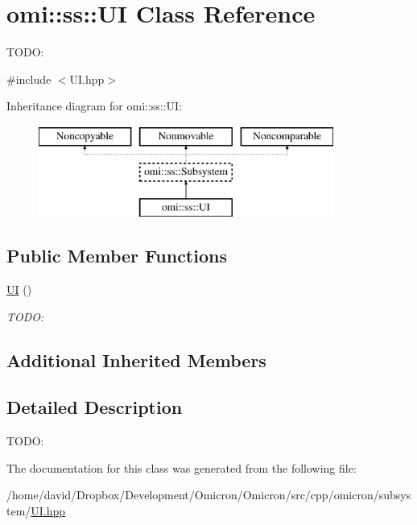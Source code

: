 \hypertarget{classomi_1_1ss_1_1_u_i}{}\section{omi\+:\+:ss\+:\+:UI Class Reference}
\label{classomi_1_1ss_1_1_u_i}


T\+O\+DO\+:  




{\ttfamily \#include $<$U\+I.\+hpp$>$}

Inheritance diagram for omi\+:\+:ss\+:\+:UI\+:\begin{figure}[H]
\begin{center}
\leavevmode
\includegraphics[height=3.000000cm]{classomi_1_1ss_1_1_u_i}
\end{center}
\end{figure}
\subsection*{Public Member Functions}
\begin{DoxyCompactItemize}
\item 
\hyperlink{classomi_1_1ss_1_1_u_i_a90c50210ffb99c79c36f9c6301861620}{UI} ()\hypertarget{classomi_1_1ss_1_1_u_i_a90c50210ffb99c79c36f9c6301861620}{}\label{classomi_1_1ss_1_1_u_i_a90c50210ffb99c79c36f9c6301861620}

\begin{DoxyCompactList}\small\item\em T\+O\+DO\+: \end{DoxyCompactList}\end{DoxyCompactItemize}
\subsection*{Additional Inherited Members}


\subsection{Detailed Description}
T\+O\+DO\+: 

The documentation for this class was generated from the following file\+:\begin{DoxyCompactItemize}
\item 
/home/david/\+Dropbox/\+Development/\+Omicron/\+Omicron/src/cpp/omicron/subsystem/\hyperlink{_u_i_8hpp}{U\+I.\+hpp}\end{DoxyCompactItemize}
